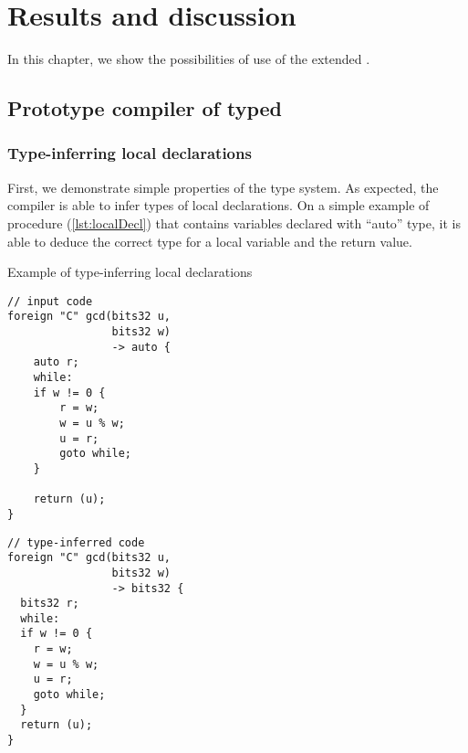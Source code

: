 \chapter{Results and discussion}
\label{chap4}

In this chapter, we show the possibilities of use of the extended \cmm{}.

\section{Prototype compiler of typed \cmm{}}

\subsection{Type-inferring local declarations}

First, we demonstrate simple properties of the type system. As expected, the compiler is able to infer types of local declarations. On a simple example of  procedure (\cref{lst:localDecl}) that contains variables declared with ``auto'' type, it is able to deduce the correct type for a local variable and the return value.

\begin{listing}
    \caption{Example of type-inferring local declarations}
    \label{lst:localDecl}
    \begin{center}
    \begin{minipage}{0.5\linewidth}
    \begin{lstlisting}
// input code
foreign "C" gcd(bits32 u,
                bits32 w)
                -> auto {
    auto r;
    while:
    if w != 0 {
        r = w;
        w = u % w;
        u = r;
        goto while;
    }

    return (u);
}
    \end{lstlisting}
    \end{minipage}%
    \begin{minipage}{0.5\linewidth}
    \begin{lstlisting}
// type-inferred code
foreign "C" gcd(bits32 u,
                bits32 w)
                -> bits32 {
  bits32 r;
  while:
  if w != 0 {
    r = w;
    w = u % w;
    u = r;
    goto while;
  }
  return (u);
}
    \end{lstlisting}
    \end{minipage}
    \end{center}
\end{listing}
